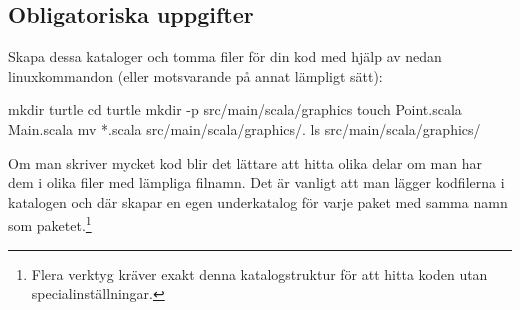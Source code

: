 %
%
%
%
%
%
%
%
%
%
%
%
%
%
%
%
%
%
%
%
%
%
%
%
%

\subsection{Obligatoriska uppgifter}


\Task Skapa dessa kataloger %
och tomma filer för din kod med hjälp av nedan linuxkommandon (eller motsvarande på annat lämpligt sätt):
\begin{REPLnonum}
mkdir turtle
cd turtle
mkdir -p src/main/scala/graphics
touch Point.scala Main.scala 
mv *.scala src/main/scala/graphics/.
ls src/main/scala/graphics/
\end{REPLnonum}
Om man skriver mycket kod blir det lättare att hitta olika delar om man har dem i olika filer med lämpliga  filnamn. Det är vanligt att man lägger kodfilerna i katalogen  och där skapar en egen underkatalog för varje paket med samma namn som paketet.\footnote{Flera verktyg kräver exakt denna katalogstruktur för att hitta koden utan specialinställningar.} 


